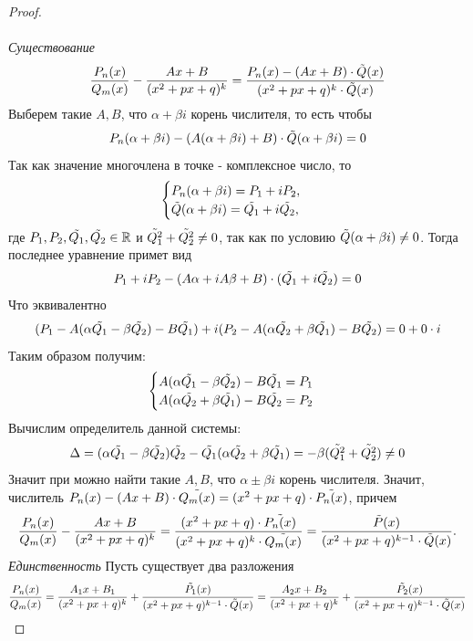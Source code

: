 \documentclass{article}
\newcommand*{\p}[1][n]{P_{#1}(x)}
\newcommand*{\Q}[1][m]{Q_{#1}(x)}
\newcommand*{\Rfrac}[2]{\frac{\p{#1}}{\Q{#2}}}
\newcommand*{\Sfrac}{\frac{Ax+B}{(x^2 + px + q)^k}}
\begin{document}
\begin{proof}
    \textit{\\\\Существование}
    $$
        \Rfrac{}{} - \Sfrac = \frac{\p - (Ax + B) \cdot \Tilde{Q}(x)}{(x^2 + px + q)^k \cdot \Tilde{Q}(x)}
    $$
    Выберем такие $A, B$, что $\alpha + \beta i$ корень числителя, то есть чтобы
    $$
        P_n(\alpha + \beta i) - (A(\alpha + \beta i) + B) \cdot \Tilde{Q}(\alpha + \beta i) = 0
    $$
    Так как значение многочлена в точке - комплексное число, то
    \begin{equation*}
        \begin{cases}
            P_n(\alpha + \beta i) = P_1 + iP_2,
            \\
            \Tilde{Q}(\alpha + \beta i) = \Tilde{Q_1} + i\Tilde{Q_2},
        \end{cases}
    \end{equation*}
    где $P_1, P_2, \Tilde{Q_1}, \Tilde{Q_2} \in \mathbb{R}$ и $\Tilde{Q_1^2} + \Tilde{Q_2^2} \neq 0$, так как по условию $\Tilde{Q}(\alpha + \beta i) \neq 0$. Тогда последнее уравнение примет вид
    $$ 
        P_1 + iP_2 - (A\alpha + iA\beta + B) \cdot (\Tilde{Q_1} + i\Tilde{Q_2}) = 0
    $$
    Что эквивалентно
    $$
        (P_1 - A(\alpha\Tilde{Q_1} - \beta\Tilde{Q_2}) - B\Tilde{Q_1}) + i(P_2 - A(\alpha\Tilde{Q_2} + \beta\Tilde{Q_1}) - B\Tilde{Q_2}) = 0 + 0 \cdot i
    $$ 
    Таким образом получим:
    \begin{equation*}
        \begin{cases}
            A(\alpha\Tilde{Q_1} - \beta\Tilde{Q_2}) - B\Tilde{Q_1} = P_1
            \\
            A(\alpha\Tilde{Q_2} + \beta\Tilde{Q_1}) - B\Tilde{Q_2} = P_2
        \end{cases}
    \end{equation*}
    Вычислим определитель данной системы:
    $$
        \Delta = (\alpha\Tilde{Q_1} - \beta\Tilde{Q_2})\Tilde{Q_2} - \Tilde{Q_1}(\alpha\Tilde{Q_2} + \beta\Tilde{Q_1}) = - \beta(\Tilde{Q_1^2} + \Tilde{Q_2^2}) \neq 0
    $$
    Значит при можно найти такие $A, B$, что $\alpha \pm \beta i$ корень числителя. Значит, числитель $\p - (Ax + B) \cdot \Tilde{\Q} = (x^2 + px + q) \cdot \Tilde{\p}$,
    причем
    $$
        \Rfrac{}{} - \Sfrac = \frac{(x^2 + px + q) \cdot \Tilde{\p}}{(x^2 + px + q)^k \cdot \Tilde{\Q}} = \frac{\Tilde{P}(x)}{(x^2 + px + q)^{k - 1} \cdot \Tilde{Q}(x)}.
    $$
    \textit{Единственность}
    Пусть существует два разложения
    $$
        \Rfrac{}{} = \frac{A_1x + B_1}{(x^2 + px + q)^k} + \frac{\Tilde{P_1}(x)}{(x^2 + px + q)^{k-1} \cdot \Tilde{Q}(x)} = \frac{A_2x + B_2}{(x^2 + px + q)^k} + \frac{\Tilde{P_2}(x)}{(x^2 + px + q)^{k-1} \cdot \Tilde{Q}(x)}
$$
\end{proof}
\end{document}
